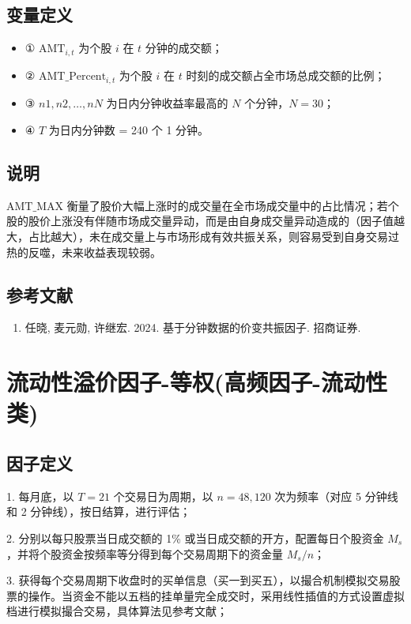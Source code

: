 \documentclass{article}
\begin{document}
\subsection{变量定义}
\begin{itemize}
    \item ① \( \mathrm{AMT}_{i,t} \) 为个股 \( i \) 在 \( t \) 分钟的成交额；
    \item ② \( \mathrm{AMT\_Percent}_{i,t} \) 为个股 \( i \) 在 \( t \) 时刻的成交额占全市场总成交额的比例；
    \item ③ \( n1, n2, \ldots, nN \) 为日内分钟收益率最高的 \( N \) 个分钟，\( N=30 \)；
    \item ④ \( T \) 为日内分钟数 = 240 个 1 分钟。
\end{itemize}

\subsection{说明}
\( \mathrm{AMT\_MAX} \) 衡量了股价大幅上涨时的成交量在全市场成交量中的占比情况；若个股的股价上涨没有伴随市场成交量异动，而是由自身成交量异动造成的（因子值越大，占比越大），未在成交量上与市场形成有效共振关系，则容易受到自身交易过热的反噬，未来收益表现较弱。

\subsection{参考文献}
\begin{enumerate}
    \item 任晓, 麦元勋, 许继宏. 2024. 基于分钟数据的价变共振因子. 招商证券.
\end{enumerate}

\section{流动性溢价因子-等权(高频因子-流动性类)}

\subsection{因子定义}

1. 每月底，以 \( T=21 \) 个交易日为周期，以 \( n=48,120 \) 次为频率（对应 5 分钟线和 2 分钟线），按日结算，进行评估；

2. 分别以每只股票当日成交额的 1\% 或当日成交额的开方，配置每日个股资金 \( M_s \)，并将个股资金按频率等分得到每个交易周期下的资金量 \( M_s/n \)；

3. 获得每个交易周期下收盘时的买单信息（买一到买五），以撮合机制模拟交易股票的操作。当资金不能以五档的挂单量完全成交时，采用线性插值的方式设置虚拟档进行模拟撮合交易，具体算法见参考文献；
\end{document}
